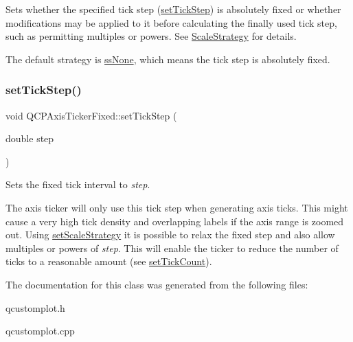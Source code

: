 Sets whether the specified tick step (\hyperlink{class_q_c_p_axis_ticker_fixed_a4bc83d85a4f81d4abdd3fa5042d7b833}{set\+Tick\+Step}) is absolutely fixed or whether modifications may be applied to it before calculating the finally used tick step, such as permitting multiples or powers. See \hyperlink{class_q_c_p_axis_ticker_fixed_a15b3d38b935d404b1311eb85cfb6a439}{Scale\+Strategy} for details.

The default strategy is \hyperlink{class_q_c_p_axis_ticker_fixed_a15b3d38b935d404b1311eb85cfb6a439a6621275677a05caa0de204ae3956b85f}{ss\+None}, which means the tick step is absolutely fixed. \mbox{\label{class_q_c_p_axis_ticker_fixed_a4bc83d85a4f81d4abdd3fa5042d7b833}} 
\subsubsection{\texorpdfstring{set\+Tick\+Step()}{setTickStep()}}
{\footnotesize\ttfamily void Q\+C\+P\+Axis\+Ticker\+Fixed\+::set\+Tick\+Step (\begin{DoxyParamCaption}\item[{double}]{step }\end{DoxyParamCaption})}

Sets the fixed tick interval to {\itshape step}.

The axis ticker will only use this tick step when generating axis ticks. This might cause a very high tick density and overlapping labels if the axis range is zoomed out. Using \hyperlink{class_q_c_p_axis_ticker_fixed_acbc7c9bcd80b3dc3edee5f0519d301f6}{set\+Scale\+Strategy} it is possible to relax the fixed step and also allow multiples or powers of {\itshape step}. This will enable the ticker to reduce the number of ticks to a reasonable amount (see \hyperlink{class_q_c_p_axis_ticker_a47752abba8293e6dc18491501ae34008}{set\+Tick\+Count}). 

The documentation for this class was generated from the following files\+:\begin{DoxyCompactItemize}
\item 
qcustomplot.\+h\item 
qcustomplot.\+cpp\end{DoxyCompactItemize}
